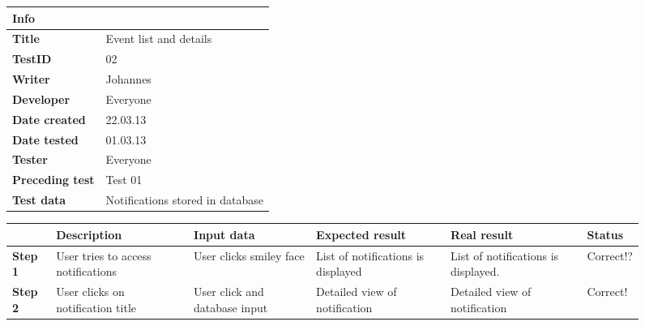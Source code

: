 \begin{figure}
\small

\begin{tabularx}{\textwidth }{|l|X|}
\hline
\cellcolor{blue!25}\textbf{Info} & \cellcolor{blue!25}\\
\hline
\textbf{Title} & Event list and details\\
\hline
\textbf{TestID} & 02\\
\hline
\textbf{Writer}& Johannes\\
\hline
\textbf{Developer}& Everyone\\
\hline
\textbf{Date created}& 22.03.13\\
\hline
\textbf{Date tested}& 01.03.13\\
\hline
\textbf{Tester}& Everyone\\
\hline
\textbf{Preceding test}& Test 01\\
\hline
\textbf{Test data} & Notifications stored in database \\
\hline
\end{tabularx}

\begin{tabularx}{\textwidth}{|X|X|X|X|X|X|}
\hline
\cellcolor{blue!25}&
\cellcolor{blue!25}Description&
\cellcolor{blue!25}Input data&
\cellcolor{blue!25}Expected result&
\cellcolor{blue!25}Real result&
\cellcolor{blue!25}Status\\
\hline
\textbf{Step 1} & User tries to access notifications  & User clicks smiley face & List of notifications is displayed & List of notifications is displayed. & Correct!?\\
\hline
\textbf{Step 2} & User clicks on notification title & User click and database input & Detailed view of notification & Detailed view of notification&Correct!\\
\hline
\end{tabularx}
\label{fig:test02}
\end{figure}